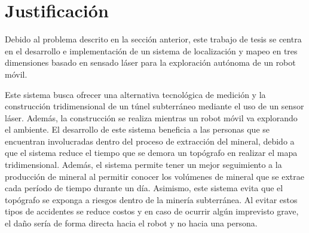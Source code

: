 \section{Justificación}

Debido al problema descrito en la sección anterior, este trabajo de tesis se centra 
en el desarrollo e implementación de un sistema de localización y mapeo en tres 
dimensiones basado en sensado láser para la exploración autónoma de un robot móvil.

Este sistema busca ofrecer una alternativa tecnológica de medición y la construcción 
tridimensional de un túnel subterráneo mediante el uso de un sensor láser. Además, la
construcción se realiza mientras un robot móvil va explorando el ambiente. El 
desarrollo de este sistema beneficia a las personas que se encuentran involucradas 
dentro del proceso de extracción del mineral, debido a que el sistema reduce el tiempo 
que se demora un topógrafo en realizar el mapa tridimensional. Además, el sistema permite
tener un mejor seguimiento a la producción de mineral al permitir conocer los volúmenes
de mineral que se extrae cada período de tiempo durante un día. Asimismo, este sistema 
evita que el topógrafo se exponga a riesgos dentro de la minería subterránea. Al evitar 
estos tipos de accidentes se reduce costos y en caso de ocurrir algún imprevisto
grave, el daño sería de forma directa hacia el robot y no hacia una persona.


